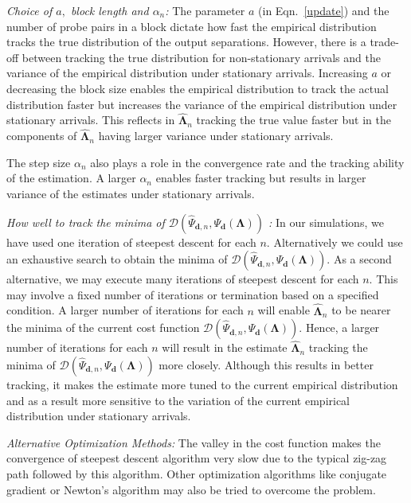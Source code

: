 \documentclass[11pt]{article}
\begin{document}
\noindent
\emph{Choice of $a,$ block length and $\alpha_n$:} The parameter $a$
(in Eqn.~\ref{update}) and the number of probe pairs in a block
dictate how fast the empirical distribution tracks the true
distribution of the output separations.  However, there is a trade-off
between tracking the true distribution for non-stationary arrivals and
the variance of the empirical distribution under stationary arrivals.
Increasing $a$ or decreasing the block size enables the empirical
distribution to track the actual distribution faster but increases the
variance of the empirical distribution under stationary arrivals. This
reflects in $\hat{\mathbf{\Lambda}}_n$ tracking the true value faster
but in the components of $\hat{\mathbf{\Lambda}}_n$ having larger
variance under stationary arrivals.

The step size $\alpha_n$ also plays a role in the convergence rate and
the tracking ability of the estimation. A larger $\alpha_n$ enables
faster tracking but results in larger variance of the estimates under
stationary arrivals.

\noindent
\emph{How well to track the minima of $\mathcal{D} \left(
    \hat{\Psi}_{\mathbf{d},n}, \Psi_{\mathbf{d}}\left(
      \mathbf{\Lambda} \right) \right)$ :} In our simulations, we have
used one iteration of steepest descent for each $n$.  Alternatively we
could use an exhaustive search to obtain the minima of $\mathcal{D}
\left( \hat{\Psi}_{\mathbf{d},n}, \Psi_{\mathbf{d}}\left(
    \mathbf{\Lambda} \right) \right).$ As a second alternative, we may
execute many iterations of steepest descent for each $n$. This may
involve a fixed number of iterations or termination based on a
specified condition.  A larger number of iterations for each $n$ will
enable $\hat{\mathbf{\Lambda}}_n$ to be nearer the minima of the
current cost function $\mathcal{D}\left( \hat{\Psi}_{\mathbf{d},n},
  \Psi_\mathbf{d} (\mathbf{\Lambda}) \right).$ Hence, a larger number
of iterations for each $n$ will result in the estimate
$\hat{\mathbf{\Lambda}}_n$ tracking the minima of $\mathcal{D}\left(
  \hat{\Psi}_{\mathbf{d},n}, \Psi_\mathbf{d} (\mathbf{\Lambda})
\right)$ more closely.  Although this results in better tracking, it
makes the estimate more tuned to the current empirical distribution
and as a result more sensitive to the variation of the current
empirical distribution under stationary arrivals.

\noindent
\emph{Alternative Optimization Methods:} The valley in the cost
function makes the convergence of steepest descent algorithm very slow
due to the typical zig-zag path followed by this algorithm.  Other
optimization algorithms like conjugate gradient or Newton's algorithm
may also be tried to overcome the problem.
\end{document}
